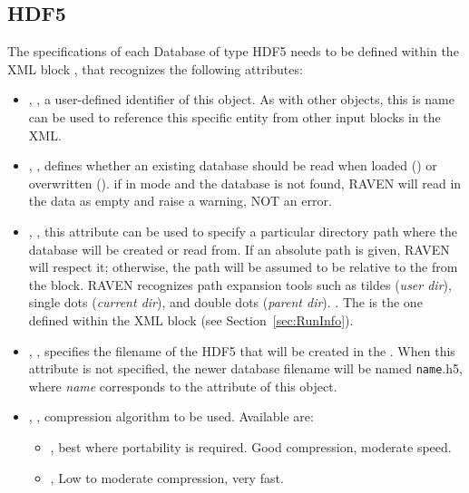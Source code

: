 \subsection{HDF5}
The specifications of each Database of type HDF5 needs to be defined within the
XML block , that recognizes the following attributes:
\vspace{-5mm}
\begin{itemize}
  \itemsep0em
  \item {}, , a user-defined
  identifier of this object.
  \nb As with other objects, this is name can be used to reference this specific
  entity from other input blocks in the XML.
  \item {}, , defines whether an existing database should
    be read when loaded () or overwritten ().
    \nb if in  mode and the database is not found, RAVEN will read in
    the data as empty and raise a warning, NOT an error.
  \item {}, , this attribute
  can be used to specify a particular directory path where the database will be
  created or read from.  If an absolute path is given, RAVEN will respect it; otherwise,
  the path will be assumed to be relative to the  from the  block.
  RAVEN recognizes path expansion tools such as tildes (\emph{user dir}), single dots (\emph{current dir}),
  and double dots (\emph{parent dir}).
  .  The  is
   the one defined within the  XML block (see Section~\ref{sec:RunInfo}).
  \item {}, , specifies the
  filename of the HDF5 that will be created in the .
  \nb When this attribute is not specified, the newer database filename will be
  named \texttt{name}.h5, where \textit{name} corresponds to the 
  attribute of this object.
  \item {}, , compression
  algorithm to be used.
  Available are:
  \begin{itemize}
    \item {}, best where portability is required.
    Good compression, moderate speed.
    \item {}, Low to moderate compression, very fast.
  \end{itemize}
\end{itemize}

